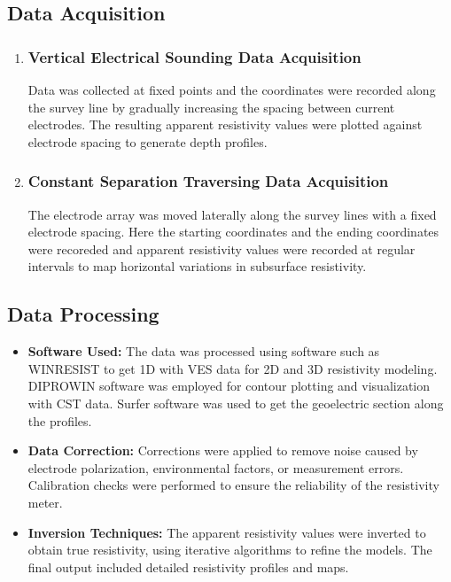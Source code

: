 \documentclass[12pt,a4paper]{report}
\begin{document}
\subsection{Data Acquisition}
\begin{enumerate}
    \item \subsubsection{Vertical Electrical Sounding Data Acquisition}
    Data was collected at fixed points and the coordinates were recorded along the survey line by gradually increasing the spacing between current electrodes. The resulting apparent resistivity values were plotted against electrode spacing to generate depth profiles.
    \item \subsubsection{Constant Separation Traversing Data Acquisition}
    The electrode array was moved laterally along the survey lines with a fixed electrode spacing. Here the starting coordinates and the ending coordinates were recoreded and apparent resistivity values were recorded at regular intervals to map horizontal variations in subsurface resistivity.
\end{enumerate}

\subsection{Data Processing}
\begin{itemize}
    \item \textbf{Software Used:} The data was processed using software such as WINRESIST to get 1D with VES data for 2D and 3D resistivity modeling. DIPROWIN software was employed for contour plotting and visualization with CST data. Surfer software was used to get the geoelectric section along the profiles.
    \item \textbf{Data Correction:} Corrections were applied to remove noise caused by electrode polarization, environmental factors, or measurement errors. Calibration checks were performed to ensure the reliability of the resistivity meter.
    \item \textbf{Inversion Techniques:} The apparent resistivity values were inverted to obtain true resistivity, using iterative algorithms to refine the models. The final output included detailed resistivity profiles and maps.
\end{itemize}
\end{document}
